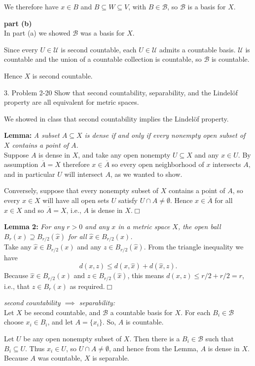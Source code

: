 \documentclass{homework}
\newcommand{\calU}{\mathcal{U}}
\newcommand{\calB}{\mathcal{B}}
\newcommand{\nextprob}{\newpage}
\begin{document}
We therefore have $x\in B$ and $B\subseteq W\subseteq V$, with
$B\in \calB$, so $\calB$ is a basis for $X$.

\textbf{part (b)}\\
In part (a)
we showed $\calB$ was a basis for $X$.

Since every $U\in\calU$ is second countable, each $U\in\calU$ admits
a countable basis.  $\calU$ is countable and the union of a countable
collection is countable, so $\calB$ is countable.

Hence $X$ is second countable.

\nextprob
\begin{exercise}{3. Problem 2-20}
Show that second countability, separability, and the Lindel\"of property
are all equivalent for metric spaces.
\end{exercise}
\solution
We showed in class that second countability implies the Lindel\"of property.

\textbf{Lemma:} \textit{A subset $A\subseteq X$ is dense if and only if
every nonempty open subset of $X$ contains a point of $A$.}\\
Suppose $A$ is dense in $X$, and take any open nonempty $U\subseteq X$
and any $x\in U$.  By assumption $\overline{A}=X$
therefore $x\in\overline{A}$ so every open neighborhood of $x$
intersects $A$, and in particular $U$ will intersect $A$, as we wanted to show.

Conversely, suppose that every nonempty subset
of $X$ contains a point of $A$, so every $x\in X$ will have all
open sets $U$ satisfy $U\cap A\ne\emptyset$.  Hence $x\in\overline{A}$
for all $x\in X$ and so $\overline{A}=X$, i.e., $A$ is
dense in $X$.\hfill$\Box$

\textbf{Lemma 2:} \textit{For any $r>0$ and any $x$ in a metric space $X$,
the open ball $B_r(x)\supseteq B_{r/2}(\hat x)$ for all $\hat x\in B_{r/2}(x)$.}\\
Take any $\hat x\in B_{r/2}(x)$ and any $z\in B_{r/2}(\hat x)$.  From the
triangle inequality we have $$d(x,z)\le d(x,\hat x) + d(\hat x,z).$$
Because
$\hat x\in B_{r/2}(x)$ and $z\in B_{r/2}(\hat x)$, this means
$d(x,z)\le r/2 + r/2 = r$, i.e., that $z\in B_r(x)$ as required.\hfill$\Box$

\textit{second countability $\implies$ separability:}\\
Let $X$ be second countable, and $\mathcal{B}$ a countable basis for $X$.  For
each $B_i\in\mathcal{B}$ choose $x_i\in B_i$, and let $A=\{x_i\}$.  So,
$A$ is countable.

Let $U$ be any open nonempty subset of $X$.  Then there is a $B_i\in\mathcal{B}$
such that $B_i\subseteq U$.  Thus $x_i\in U$, so $U\cap A\ne\emptyset$,
and hence from the Lemma, $A$ is dense in $X$.  Because $A$ was countable,
$X$ is separable.
\end{document}
